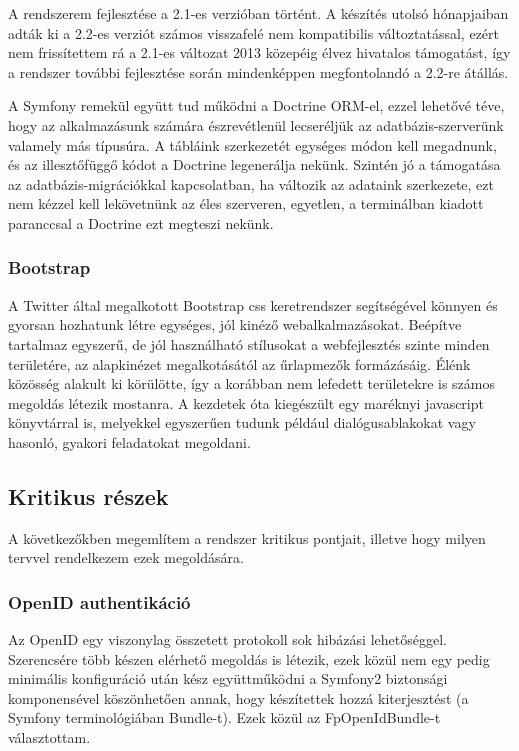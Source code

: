 \documentclass[a4paper,12pt,oneside]{report}
\begin{document}
A rendszerem fejlesztése a 2.1-es verzióban történt. A készítés utolsó hónapjaiban adták ki a 2.2-es verziót számos visszafelé nem kompatibilis változtatással, ezért nem frissítettem rá \textendash{} a 2.1-es változat 2013 közepéig élvez hivatalos támogatást, így a rendszer további fejlesztése során mindenképpen megfontolandó a 2.2-re átállás.

A Symfony remekül együtt tud működni a Doctrine ORM-el\cite{book:doctrine_orm,website:doctrine}, ezzel lehetővé téve, hogy az alkalmazásunk számára észrevétlenül lecseréljük az adatbázis-szerverünk valamely más típusúra. A tábláink szerkezetét egységes módon kell megadnunk, és az illesztőfüggő kódot a Doctrine legenerálja nekünk. Szintén jó a támogatása az adatbázis-migrációkkal kapcsolatban, ha változik az adataink szerkezete, ezt nem kézzel kell lekövetnünk az éles szerveren, egyetlen, a terminálban kiadott paranccsal a Doctrine ezt megteszi nekünk.

\subsubsection{Bootstrap}

A Twitter által megalkotott Bootstrap\cite{website:bootstrap} css keretrendszer segítségével könnyen és gyorsan hozhatunk létre egységes, jól kinéző webalkalmazásokat. Beépítve tartalmaz egyszerű, de jól használható stílusokat a webfejlesztés szinte minden területére, az alapkinézet megalkotásától az űrlapmezők formázásáig. Élénk közösség alakult ki körülötte, így a korábban nem lefedett területekre is számos megoldás létezik mostanra. A kezdetek óta kiegészült egy maréknyi javascript könyvtárral is, melyekkel egyszerűen tudunk például dialógusablakokat vagy hasonló, gyakori feladatokat megoldani.

\subsection{Kritikus részek}

A következőkben megemlítem a rendszer kritikus pontjait, illetve hogy milyen tervvel rendelkezem ezek megoldására.

\subsubsection{OpenID authentikáció}

Az OpenID\cite{website:openid_specifikacio} egy viszonylag összetett protokoll sok hibázási lehetőséggel. Szerencsére több készen elérhető megoldás is létezik, ezek közül nem egy pedig minimális konfiguráció után kész együttműködni a Symfony2 biztonsági komponensével köszönhetően annak, hogy készítettek hozzá kiterjesztést (a Symfony terminológiában Bundle-t). Ezek közül az FpOpenIdBundle\cite{website:fpopenidbundle}-t választottam.
\end{document}
